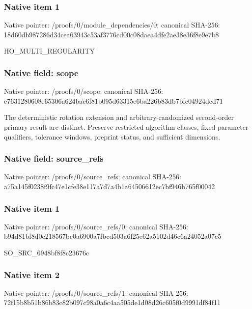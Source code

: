 \documentclass[10pt,a4paper]{article}
\begin{document}
\subsubsection{Native item 1}
Native pointer: /proofs/0/module\_\allowbreak{}dependencies/0; canonical SHA-256: 18d60db987286d34cea63943c53af3776cd00c08daea4dfe2ae38e36f8e9e7b8

\begingroup\raggedright\sloppy HO\_\allowbreak{}MULTI\_\allowbreak{}REGULARITY\par\endgroup

\subsubsection{Native field: scope}
Native pointer: /proofs/0/scope; canonical SHA-256: e7631280608e65306a624bac6f81b095d63315e6ba226b83db7bfc04924dcd71

\begingroup\raggedright\sloppy The deterministic rotation extension and arbitrary-randomized second-order primary result are distinct. Preserve restricted algorithm classes,\allowbreak{} fixed-parameter qualifiers,\allowbreak{} tolerance windows,\allowbreak{} preprint status,\allowbreak{} and sufficient dimensions.\par\endgroup

\subsubsection{Native field: source\_\allowbreak{}refs}
Native pointer: /proofs/0/source\_\allowbreak{}refs; canonical SHA-256: a75a145f0238f9fc47e1cfe38e117a7d7a4b1a64506612ec7bf946b765f00042

\subsubsection{Native item 1}
Native pointer: /proofs/0/source\_\allowbreak{}refs/0; canonical SHA-256: b94d81bf8d0c218567bc0a6900a7fbcd503a6f25e62a5102d46c6a24052a07e5

\begingroup\raggedright\sloppy SO\_\allowbreak{}SRC\_\allowbreak{}6948bf8f8c23676c\par\endgroup

\subsubsection{Native item 2}
Native pointer: /proofs/0/source\_\allowbreak{}refs/1; canonical SHA-256: 72f15b8b51b86b83c82b097c98a0a6c4aa505de1d08d26c605f0d9991df84f11
\end{document}

